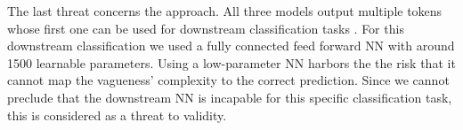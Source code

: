 The last threat concerns the approach.
All three models output multiple tokens whose first one can be used for downstream classification tasks \parencite{Devlin:2018}.
For this downstream classification we used a fully connected feed forward \ac{NN} with around 1500 learnable parameters.
Using a low-parameter \ac{NN} harbors the the risk that it cannot map the vagueness' complexity to the correct prediction.
Since we cannot preclude that the downstream \ac{NN} is incapable for this specific classification task, this is considered as a threat to validity.

